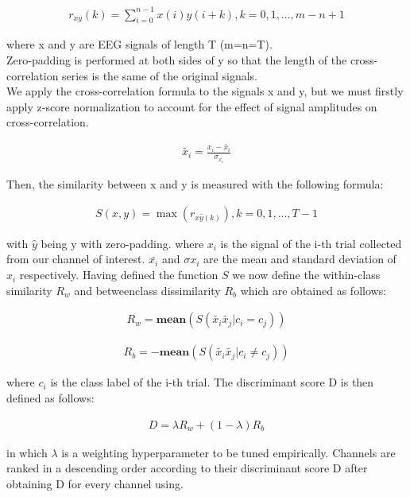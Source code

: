 \documentclass{Configuration_Files/PoliMi3i_thesis}
\begin{document}
\begin{align}
	 r_{xy}(k) = \sum_{i=0}^{n-1}x(i)y(i + k), k = 0,1,...,m-n+1
	\label{eq:XCDC1}
\end{align}

where x and y are EEG signals of length T (m=n=T). \\ 
Zero-padding is performed at both sides of y so that the length of the cross-correlation series is the same of the original signals. \\
We apply the cross-correlation formula to the signals x and y, but we must firstly apply z-score normalization to account for the effect of signal amplitudes on cross-correlation.

\begin{align}
	\tilde{x_i} = \frac{x_i - \bar x_i}{\sigma_{x_i}}
   \label{eq:XCDC3}
\end{align}


Then, the similarity between x and y is measured with the following formula:

\begin{align}
	S(x,y) = \max(r_{x\hat{y}(k)}), k=0,1,..., T - 1 
   \label{eq:XCDC2}
\end{align}

with $\hat{y}$ being y with zero-padding.
where $x_i$ is the signal of the i-th trial collected from our channel of interest. $\bar{x_i}$ and $\sigma{x_i}$ are
the mean and standard deviation of $x_i$ respectively.
Having defined the function $S$ we now define the within-class similarity $R_w$ and betweenclass dissimilarity $R_b$ which are obtained as follows:

\begin{align}
	R_w = \mathbf{mean}(S(\tilde{x_i}\tilde{x_j}| c_i = c_j))
   \label{eq:XCDC4}
\end{align}

\begin{align}
	R_b = -\mathbf{mean}(S(\tilde{x_i}\tilde{x_j}| c_i \neq  c_j))
   \label{eq:XCDC5}
\end{align}

where $c_i$ is the class label of the i-th trial. The discriminant score D is then defined as follows:

\begin{align}
	D = \lambda R_w + (1-\lambda)R_b
   \label{eq:XCDC6}
\end{align}

in which $\lambda$ is a weighting hyperparameter to be tuned empirically.
Channels are ranked in a descending order according to their discriminant score D after obtaining D for every channel using.
\end{document}
